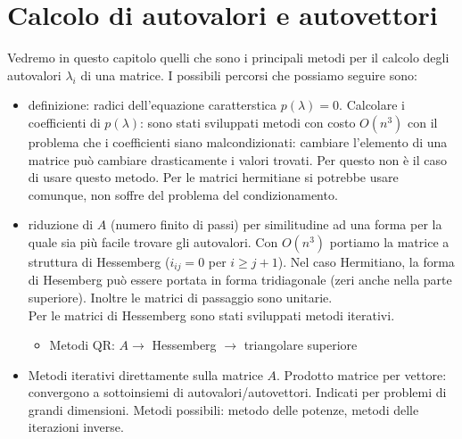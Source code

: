 


\inbpdocument 

\chapter{Calcolo di autovalori e autovettori}

Vedremo in questo capitolo quelli che sono i principali metodi per il calcolo degli autovalori $\lambda_i$ di una matrice. I possibili percorsi che  possiamo seguire sono:

\begin{itemize}

\item definizione: radici dell'equazione caratterstica $p(\lambda)=0$.
Calcolare i coefficienti di $p(\lambda)$: sono stati sviluppati metodi
con costo $O(n^3)$ con il problema che i coefficienti siano
malcondizionati: cambiare l'elemento di una matrice pu\`o cambiare
drasticamente i valori trovati.  Per questo non \`e il caso di usare
questo metodo.  Per le matrici hermitiane si potrebbe usare comunque,
non soffre del problema del condizionamento.

\item riduzione di $A$ (numero finito di passi) per similitudine ad
una forma per la quale sia pi\`u facile trovare gli autovalori.  Con
$O(n^3)$ portiamo la matrice a struttura di Hessemberg ($i_{ij}=0$ per
$i \geq j+1$).  Nel caso Hermitiano, la forma di Hesemberg pu\`o
essere portata in forma tridiagonale (zeri anche nella parte
superiore). Inoltre le matrici di passaggio sono unitarie.
\\
Per le matrici di Hessemberg sono stati sviluppati metodi
iterativi.
\begin{itemize}
 \item Metodi QR: $A \rightarrow$ Hessemberg $\rightarrow$ triangolare
  superiore
\end{itemize}

\item Metodi iterativi direttamente sulla matrice $A$.
  Prodotto matrice per vettore: convergono a sottoinsiemi
  di autovalori/autovettori. Indicati per problemi di grandi
  dimensioni. Metodi possibili: metodo delle potenze,
  metodi delle iterazioni inverse.

\end{itemize}

